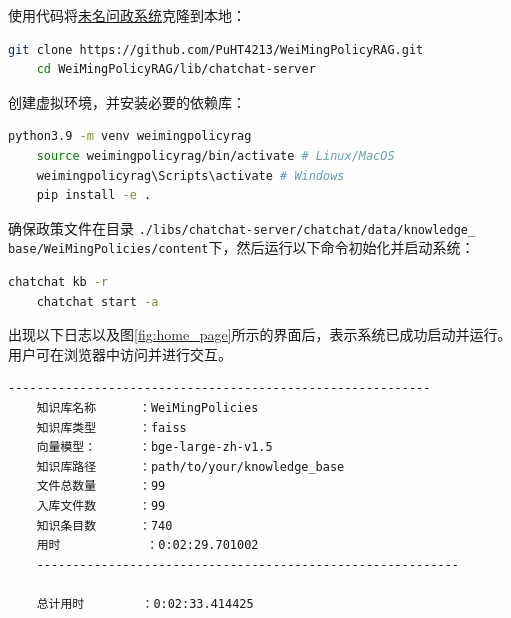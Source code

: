 \documentclass[12pt, a4paper]{ctexart}
\begin{document}
使用代码将\href{https://github.com/PuHT4213/WeiMingPolicyRAG}{\underline{未名问政系统}}克隆到本地：
\begin{lstlisting}[language=bash]
    git clone https://github.com/PuHT4213/WeiMingPolicyRAG.git
    cd WeiMingPolicyRAG/lib/chatchat-server
\end{lstlisting}

创建虚拟环境，并安装必要的依赖库：
\begin{lstlisting}[language=bash]
    python3.9 -m venv weimingpolicyrag
    source weimingpolicyrag/bin/activate # Linux/MacOS
    weimingpolicyrag\Scripts\activate # Windows
    pip install -e .
\end{lstlisting}

确保政策文件在目录 \texttt{./libs/chatchat-server/chatchat/data/knowledge\_\\base/WeiMingPolicies/content}下，然后运行以下命令初始化并启动系统：
\begin{lstlisting}[language=bash]
    chatchat kb -r
    chatchat start -a
\end{lstlisting}

出现以下日志以及图\ref{fig:home_page}所示的界面后，表示系统已成功启动并运行。用户可在浏览器中访问并进行交互。
\begin{lstlisting}[language=bash]
    -----------------------------------------------------------
    知识库名称      ：WeiMingPolicies
    知识库类型      ：faiss
    向量模型：      ：bge-large-zh-v1.5
    知识库路径      ：path/to/your/knowledge_base
    文件总数量      ：99
    入库文件数      ：99
    知识条目数      ：740
    用时            ：0:02:29.701002
    -----------------------------------------------------------
    
    总计用时        ：0:02:33.414425
\end{lstlisting} 
\end{document}
